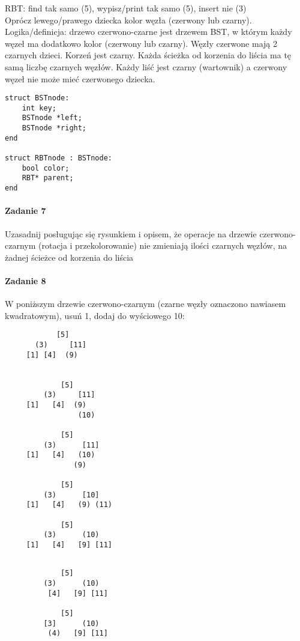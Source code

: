 \documentclass[18pt]{extarticle}
\begin{document}
RBT: find tak samo (5), wypisz/print tak samo (5), insert nie (3) \\

Oprócz lewego/prawego dziecka kolor węzła (czerwony lub czarny). 
Logika/definicja: drzewo czerwono-czarne jest drzewem BST, w którym każdy węzeł ma dodatkowo kolor (czerwony lub czarny). Węzły czerwone mają 2 czarnych dzieci. Korzeń jest czarny. Każda ścieżka od korzenia do liścia ma tę samą liczbę czarnych węzłów. Każdy liść jest czarny (wartownik) a czerwony węzeł nie może mieć czerwonego dziecka. \\

\begin{lstlisting}
struct BSTnode:
    int key;	 
    BSTnode *left;	 
    BSTnode *right;
end

struct RBTnode : BSTnode:
    bool color;	 
    RBT* parent;
end
\end{lstlisting}

\paragraph{Zadanie 7} Uzasadnij posługując się rysunkiem i opisem, że operacje na drzewie czerwono-czarnym (rotacja i przekolorowanie) nie zmieniają ilości czarnych węzłów, na żadnej ścieżce od korzenia
do liścia

\paragraph{Zadanie 8} W poniższym drzewie czerwono-czarnym (czarne węzły oznaczono nawiasem kwadratowym), usuń 1, dodaj do wyściowego 10:

\begin{multicols}{2}
    \begin{lstlisting}
            [5] 
       (3)     [11] 
     [1] [4]  (9) 
    
    
             [5] 
         (3)     [11] 
     [1]   [4]  (9) 
                 (10) 
     
             [5] 
         (3)      [11] 
     [1]   [4]   (10) 
                (9) 
     
             [5] 
         (3)      [10] 
     [1]   [4]   (9) (11)
     
             [5] 
         (3)      (10) 
     [1]   [4]   [9] [11]
                 
    \end{lstlisting}
    
    \columnbreak
    \begin{lstlisting}
             [5] 
         (3)      (10) 
          [4]   [9] [11]
    
             [5] 
         [3]      (10) 
          (4)   [9] [11]
    \end{lstlisting}
    \end{multicols}
\end{document}
